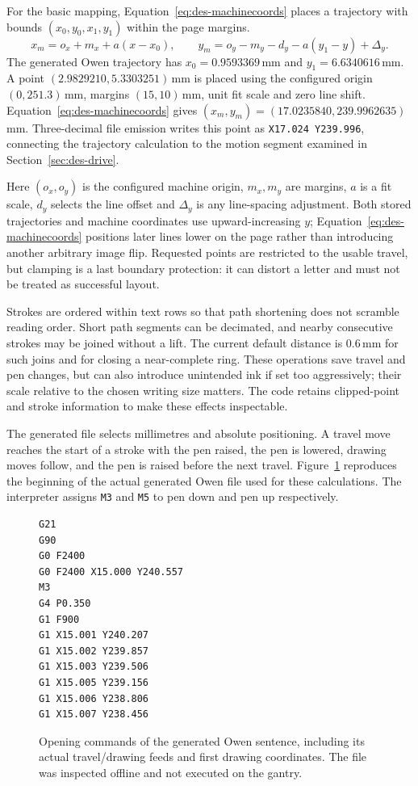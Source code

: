 For the basic mapping, Equation~\ref{eq:des-machinecoords} places a trajectory with bounds $(x_0,y_0,x_1,y_1)$ within the page margins.
\begin{equation}
x_m=o_x+m_x+a(x-x_0),\qquad
y_m=o_y-m_y-d_y-a(y_1-y)+\Delta_y.
\label{eq:des-machinecoords}
\end{equation}
The generated Owen trajectory has $x_0=0.9593369$\,mm and $y_1=6.6340616$\,mm. A point $(2.9829210,5.3303251)$\,mm is placed using the configured origin $(0,251.3)$\,mm, margins $(15,10)$\,mm, unit fit scale and zero line shift. Equation~\ref{eq:des-machinecoords} gives $(x_m,y_m)=(17.0235840,239.9962635)$\,mm. Three-decimal file emission writes this point as \texttt{X17.024 Y239.996}, connecting the trajectory calculation to the motion segment examined in Section~\ref{sec:des-drive}.

Here $(o_x,o_y)$ is the configured machine origin, $m_x,m_y$ are margins, $a$ is a fit scale, $d_y$ selects the line offset and $\Delta_y$ is any line-spacing adjustment. Both stored trajectories and machine coordinates use upward-increasing $y$; Equation~\ref{eq:des-machinecoords} positions later lines lower on the page rather than introducing another arbitrary image flip. Requested points are restricted to the usable travel, but clamping is a last boundary protection: it can distort a letter and must not be treated as successful layout.

Strokes are ordered within text rows so that path shortening does not scramble reading order. Short path segments can be decimated, and nearby consecutive strokes may be joined without a lift. The current default distance is 0.6\,mm for such joins and for closing a near-complete ring. These operations save travel and pen changes, but can also introduce unintended ink if set too aggressively; their scale relative to the chosen writing size matters. The code retains clipped-point and stroke information to make these effects inspectable.

The generated file selects millimetres and absolute positioning. A travel move reaches the start of a stroke with the pen raised, the pen is lowered, drawing moves follow, and the pen is raised before the next travel. Figure~\ref{fig:des-gcode-excerpt} reproduces the beginning of the actual generated Owen file used for these calculations. The interpreter assigns \texttt{M3} and \texttt{M5} to pen down and pen up respectively.

\begin{figure}[!htbp]
\begin{lstlisting}[style=designcode]
G21
G90
G0 F2400
G0 F2400 X15.000 Y240.557
M3
G4 P0.350
G1 F900
G1 X15.001 Y240.207
G1 X15.002 Y239.857
G1 X15.003 Y239.506
G1 X15.005 Y239.156
G1 X15.006 Y238.806
G1 X15.007 Y238.456
\end{lstlisting}
\caption{Opening commands of the generated Owen sentence, including its actual travel/drawing feeds and first drawing coordinates. The file was inspected offline and not executed on the gantry.}
\label{fig:des-gcode-excerpt}
\end{figure}


